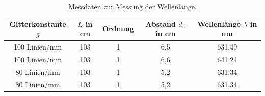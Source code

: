 \begin{table}
 \centering
 \caption{Messdaten zur Messung der Wellenlänge.}
 \label{tab:wel}
 \begin{tabular}{c c c c c}
   \toprule
   Gitterkonstante $g$ & $L$ in \si{\centi\meter}  & Ordnung & Abstand $d_\mathrm{n}$ in \si{\centi\meter} & Wellenlänge $\lambda$ in \si{\nano\meter} \\
   \midrule
   100 Linien/mm & 103 & 1 & 6,5  & 631,49 \\
   100 Linien/mm & 103 & 1 & 6,6 & 641,21 \\
   80 Linien/mm & 103 & 1 & 5,2  & 631,34 \\
   80 Linien/mm & 103 & 1 & 5,2 & 631,34 \\
   \bottomrule
 \end{tabular}
\end{table}
